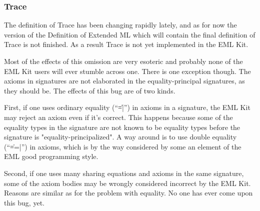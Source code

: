 \subsubsection{Trace}
\label{sec:traces}

The definition of Trace has been changing rapidly lately,
and as for now the version of the Definition of Extended ML which
will contain the final definition of Trace is not finished.
As a result Trace is not yet implemented in the EML Kit.

Most of the effects of this omission are very esoteric and probably none 
of the EML Kit users will ever stumble across one.
There is one exception though. The axioms in signatures are not elaborated
in the equality-principal signatures, as they should be. 
The effects of this bug are of two kinds.

First, if one uses ordinary equality (``\|=|'') in axioms in a signature,
the EML Kit may reject an axiom even if it's correct.
This happens because some of the equality types in the signature
are not known to be equality types 
before the signature is "equality-principalized".
A way around is to use double equality (``\|==|'') in axioms,
which is by the way considered by some an element 
of the EML good programming style.

Second, if one uses many sharing equations and axioms in the same signature,
some of the axiom bodies may be wrongly considered incorrect by the EML Kit. 
Reasons are similar as for the problem with equality.
No one has ever come upon this bug, yet.

